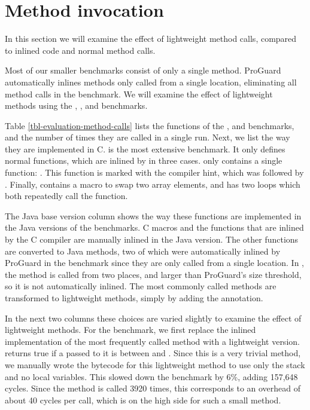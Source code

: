 \section{Method invocation}
\label{sec-evaluation-method-invocation}


In this section we will examine the effect of lightweight method calls, compared to inlined code and normal method calls.

Most of our smaller benchmarks consist of only a single method. ProGuard automatically inlines methods only called from a single location, eliminating all method calls in the  benchmark. We will examine the effect of lightweight methods using the , , and  benchmarks.

Table \ref{tbl-evaluation-method-calls} lists the functions of the ,  and  benchmarks, and the number of times they are called in a single run. Next, we list the way they are implemented in C.  is the most extensive benchmark. It only defines normal functions, which are inlined by  in three cases.  only contains a single function: . This function is marked with the  compiler hint, which was followed by . Finally,  contains a macro to swap two array elements, and has two loops which both repeatedly call the  function. 

The Java base version column shows the way these functions are implemented in the Java versions of the benchmarks. C macros and the functions that are inlined by the C compiler are manually inlined in the Java version. The other functions are converted to Java methods, two of which were automatically inlined by ProGuard in the  benchmark since they are only called from a single location. In , the  method is called from two places, and larger than ProGuard's size threshold, so it is not automatically inlined. The most commonly called methods are transformed to lightweight methods, simply by adding the  annotation. %

In the next two columns these choices are varied slightly to examine the effect of lightweight methods. For the  benchmark, we first replace the inlined implementation of the most frequently called method with a lightweight version.  returns true if a  passed to it is between  and . Since this is a very trivial method, we manually wrote the bytecode for this lightweight method to use only the stack and no local variables. This slowed down the benchmark by 6\%, adding 157,648 cycles. Since the method is called 3920 times, this corresponds to an overhead of about 40 cycles per call, which is on the high side for such a small method.

